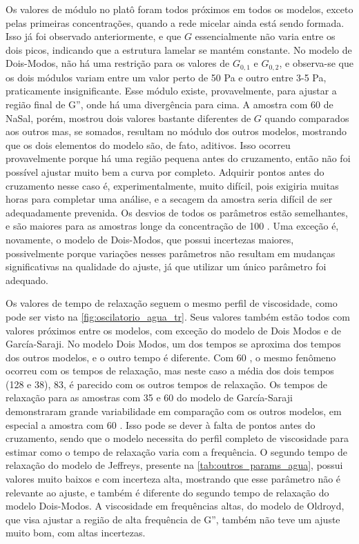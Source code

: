	Os valores de módulo no platô foram todos próximos em todos os modelos, exceto pelas primeiras concentrações, quando a rede micelar ainda está sendo formada. Isso já foi observado anteriormente, e que \(G\) essencialmente não varia entre os dois picos, indicando que a estrutura lamelar se mantém constante.
	No modelo de Dois-Modos, não há uma restrição para os valores de \(G_{0,1}\) e \(G_{0,2}\), e observa-se que os dois módulos variam entre um valor perto de 50 Pa e outro entre 3-5 Pa, praticamente insignificante. Esse módulo existe, provavelmente, para ajustar a região final de G'', onde há uma divergência para cima. A amostra com 60 \mM{} de NaSal, porém, mostrou dois valores bastante diferentes de \(G\) quando comparados aos outros mas, se somados, resultam no módulo dos outros modelos, mostrando que os dois elementos do modelo são, de fato, aditivos. Isso ocorreu provavelmente porque há uma região pequena antes do cruzamento, então não foi possível ajustar muito bem a curva por completo. Adquirir pontos antes do cruzamento nesse caso é, experimentalmente, muito difícil, pois exigiria muitas horas para completar uma análise, e a secagem da amostra seria difícil de ser adequadamente prevenida. Os desvios de todos os parâmetros estão semelhantes, e são maiores para as amostras longe da concentração de 100 \mM. Uma exceção é, novamente, o modelo de Dois-Modos, que possui incertezas maiores, possivelmente porque variações nesses parâmetros não resultam em mudanças significativas na qualidade do ajuste, já que utilizar um único parâmetro foi adequado.
	
	Os valores de tempo de relaxação seguem o mesmo perfil de viscosidade, como pode ser visto na \autoref{fig:oscilatorio_agua_tr}. Seus valores também estão todos com valores próximos entre os modelos, com exceção do modelo de Dois Modos e de García-Saraji. No modelo Dois Modos, um dos tempos se aproxima dos tempos dos outros modelos, e o outro tempo é diferente. Com 60 \mM, o mesmo fenômeno ocorreu com os tempos de relaxação, mas neste caso a média dos dois tempos (128 e 38), 83, é parecido com os outros tempos de relaxação. Os tempos de relaxação para as amostras com 35 e 60 \mM{} do modelo de García-Saraji demonstraram grande variabilidade em comparação com os outros modelos, em especial a amostra com 60 \mM. Isso pode se dever à falta de pontos antes do cruzamento, sendo que o modelo necessita do perfil completo de viscosidade para estimar como o tempo de relaxação varia com a frequência. O segundo tempo de relaxação do modelo de Jeffreys, presente na \autoref{tab:outros_params_agua}, possui valores muito baixos e com incerteza alta, mostrando que esse parâmetro não é relevante ao ajuste, e também é diferente do segundo tempo de relaxação do modelo Dois-Modos. A viscosidade em frequências altas, do modelo de Oldroyd, que visa ajustar a região de alta frequência de G'', também não teve um ajuste muito bom, com altas incertezas.
	
